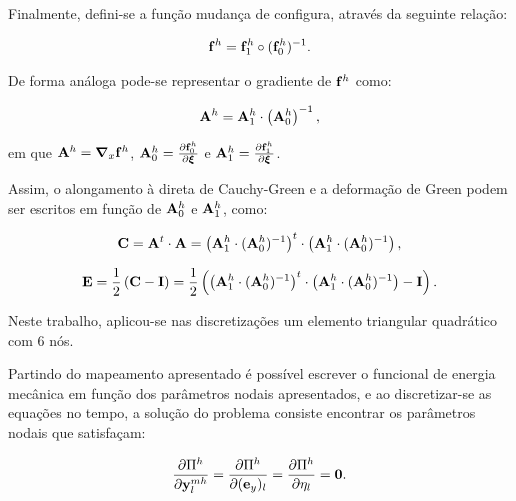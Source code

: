 Finalmente, defini-se a função mudança de configura, através da seguinte relação:

\begin{align}
	\mathbf{f}^{h} = \mathbf{f}^{h}_{1} \circ  (\mathbf{f}^{h}_{0})^{-1} \label{eq:eq_mud_conf}.
\end{align}

De forma análoga pode-se representar o gradiente de  $\mathbf{f}^{h}$ como:

\begin{align}
\mathbf{A}^{h} = \mathbf{A}^{h}_{1} \cdot \left(\mathbf{A}^{h}_{0}\right)^{-1} \label{eq:gradDeformation},
\end{align}

\noindent em que $\mathbf{A}^{h} = \boldsymbol{\nabla}_x \mathbf{f}^{h}$, $\mathbf{A}^{h}_{0} = \frac{\partial  \mathbf{f}^{h}_{0}} {\partial \boldsymbol{\xi}}$ e  $\mathbf{A}^{h}_{1} =  \frac{\partial  \mathbf{f}^{h}_{1}} {\partial \boldsymbol{\xi}}$.

Assim, o alongamento à direta de Cauchy-Green e a deformação de Green podem ser escritos em função de $\mathbf{A}^{h}_{0}$ e $\mathbf{A}^{h}_{1}$, como:

\begin{align}
	\mathbf{C} = \mathbf{A}^{t} \cdot \mathbf{A} = \left(\mathbf{A}^{h}_{1} \cdot (\mathbf{A}^{h}_{0})^{-1}\right)^{t} \cdot \left(\mathbf{A}^{h}_{1} \cdot (\mathbf{A}^{h}_{0})^{-1}\right),
\end{align}

\begin{align}
	\mathbf{E} = \frac{1}{2}\left(\mathbf{C} - \mathbf{I}\right) = \frac{1}{2}\left(\left(\mathbf{A}^{h}_{1} \cdot (\mathbf{A}^{h}_{0})^{-1}\right)^{t} \cdot \left(\mathbf{A}^{h}_{1} \cdot (\mathbf{A}^{h}_{0})^{-1}\right) - \mathbf{I}\right).
\end{align}

Neste trabalho, aplicou-se nas discretizações um elemento triangular quadrático com 6 nós.

Partindo do mapeamento apresentado é possível escrever o funcional de energia mecânica em função dos parâmetros nodais apresentados, e ao discretizar-se as equações no tempo, a solução do problema consiste encontrar os parâmetros nodais que satisfaçam:

\begin{align}
	\frac{\partial\Pi^{h}}{\partial \mathbf{y}_{l}^{mh}} = \frac{\partial\Pi^{h}}{\partial (\mathbf{e}_y)_l} = \frac{\partial\Pi^{h}}{\partial \eta_l} = \mathbf{0}.
\end{align}

